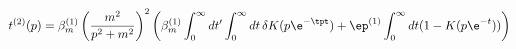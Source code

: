\begin{equation}
t^{(2)} (p) = \beta_m^{(1)} \left( \frac{m^2}{p^2+m^2}\right)^2 \left(
\beta_m^{(1)} \int_0^\infty dt' \int_0^\infty dt \, \delta K(p
\e^{-\tpt}) + \ep^{(1)} \int_0^\infty dt (1 - K(p \e^{-t})) \right)
\end{equation}

